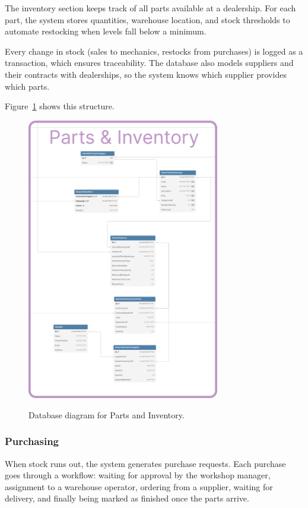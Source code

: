 The inventory section keeps track of all parts available at a dealership. For each part, the system stores quantities, warehouse location, and stock thresholds to automate restocking when levels fall below a minimum.

Every change in stock (sales to mechanics, restocks from purchases) is logged as a transaction, which ensures traceability. The database also models suppliers and their contracts with dealerships, so the system knows which supplier provides which parts.

Figure~\ref{fig:dbParts} shows this structure.

\begin{figure}[h]
  \caption{Database diagram for Parts and Inventory.}
  \centering
  \includegraphics[width=0.75\textwidth]{figs/dbDiagrams/Parts_and_Inventory}
  \label{fig:dbParts}
\end{figure}


\subsubsection{Purchasing} 


When stock runs out, the system generates purchase requests. Each purchase goes through a workflow: waiting for approval by the workshop manager, assignment to a warehouse operator, ordering from a supplier, waiting for delivery, and finally being marked as finished once the parts arrive.

